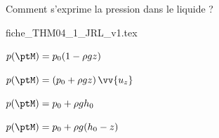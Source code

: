 \smallskip

Comment s'exprime la pression dans le liquide ? 

                                \initialisationPartieDroite %
\begin{center}
{fiche_THM04_1_JRL_v1.tex}
\end{center}
                               \finalisationDuPartageDePage %

\debutEntrainement


\begin{enonce}	
	\begin{listeQCM2Colonnes}
	\item $p(\ptM)=p_0(1-\rho g z)$
	\item $p(\ptM)=(p_0+\rho g z)\, \vv{u_z}$
	\item $p(\ptM)=p_0+\rho g h_0$
	\item $p(\ptM)=p_0+\rho g (h_0-z)$
	\end{listeQCM2Colonnes}
\end{enonce}

\reponse{\reponseB{}}



\finEntrainement




